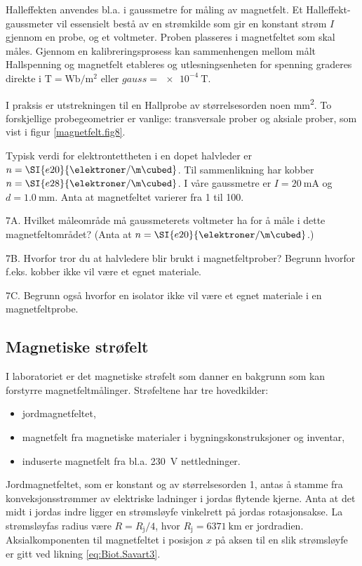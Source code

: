 \documentclass[../Elmag-labhefte-2020.tex]{subfiles}
\begin{document}

Halleffekten anvendes bl.a. i gaussmetre for måling av magnetfelt. Et Halleffekt-gaussmeter vil essensielt bestå av en strømkilde som gir en konstant strøm $I$ gjennom en probe,  og et voltmeter. Proben plasseres i magnetfeltet som skal måles. Gjennom en kalibreringsprosess kan sammenhengen mellom målt Hallspenning og magnetfelt etableres og utlesningsenheten for spenning graderes direkte i $\si{\tesla} = \si{\weber/\square\m}$ eller $\si{gauss} = \SI{e-4}{\tesla}$.

I praksis er utstrekningen til en Hallprobe av størrelsesorden noen \si{\square\mm}. To forskjellige probegeometrier er vanlige: transversale prober og aksiale prober, som vist i figur \ref{magnetfelt.fig8}.

Typisk verdi for elektrontettheten i en dopet halvleder er $n = \SI{e20}{\elektroner/\m\cubed}$. Til sammenlikning har kobber $n = \SI{e28}{\elektroner/\m\cubed}$. I våre gaussmetre er $I = \SI{20}{\milli\ampere}$ og $d = \SI{1,0}{\mm}$. Anta at magnetfeltet varierer fra 1 til \SI{100}{\gauss}.

{\itsf 7A. Hvilket måleområde må gaussmeterets voltmeter ha for å måle i dette magnetfeltområdet? (Anta at $n = \SI{e20}{\elektroner/\m\cubed}$.)

7B. Hvorfor tror du at halvledere blir brukt i magnetfeltprober? Begrunn hvorfor f.eks. kobber ikke vil være et egnet materiale.
 
7C. Begrunn også hvorfor en isolator ikke vil være et egnet materiale i en magnetfeltprobe.
}

\subsection{Magnetiske strøfelt}

I laboratoriet er det magnetiske strøfelt som danner en bakgrunn som kan forstyrre magnetfeltmålinger. Strøfeltene har tre hovedkilder: 
\vspace{-4mm}
\begin{itemize}
    \item jordmagnetfeltet,
    \item magnetfelt fra magnetiske materialer i bygningskonstruksjoner og inventar,
    \item induserte magnetfelt fra bl.a. \SI{230}{\volt} nettledninger.
\end{itemize}

Jordmagnetfeltet, som er konstant og av størrelsesorden \SI{1}{\gauss}, antas å stamme fra konveksjonsstrømmer av elektriske ladninger i jordas flytende kjerne. Anta at det midt i jordas indre ligger en strømsløyfe vinkelrett på jordas rotasjonsakse. La strømsløyfas radius være $R = R_\text{j}/4$, hvor $R_\text{j} = \SI{6371}{\km}$ er jordradien. Aksialkomponenten til magnetfeltet i posisjon $x$ på aksen til en slik strømsløyfe er gitt ved likning \eqref{eq:Biot.Savart3}.
\end{document}
